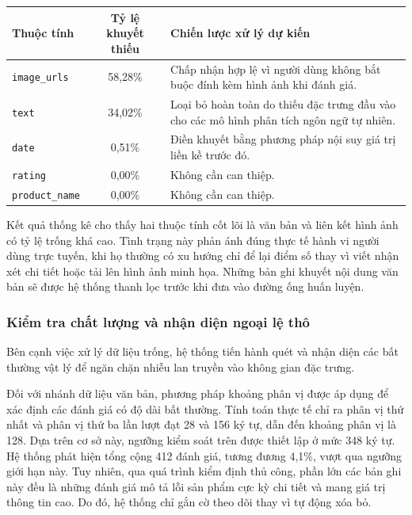 \begin{center}
\renewcommand{\arraystretch}{1.4}
\begin{tabularx}{\textwidth}{|l|c|X|}
\hline
\rowcolor[HTML]{E8E8E8}
\textbf{Thuộc tính} & \textbf{Tỷ lệ khuyết thiếu} & \textbf{Chiến lược xử lý dự kiến} \\
\hline
\texttt{image\_urls} & 58,28\% & Chấp nhận hợp lệ vì người dùng không bắt buộc đính kèm hình ảnh khi đánh giá. \\
\hline
\texttt{text} & 34,02\% & Loại bỏ hoàn toàn do thiếu đặc trưng đầu vào cho các mô hình phân tích ngôn ngữ tự nhiên. \\
\hline
\texttt{date} & 0,51\% & Điền khuyết bằng phương pháp nội suy giá trị liền kề trước đó. \\
\hline
\texttt{rating} & 0,00\% & Không cần can thiệp. \\
\hline
\texttt{product\_name} & 0,00\% & Không cần can thiệp. \\
\hline
\end{tabularx}
\end{center}

Kết quả thống kê cho thấy hai thuộc tính cốt lõi là văn bản và liên kết hình ảnh có tỷ lệ trống khá cao. Tình trạng này phản ánh đúng thực tế hành vi người dùng trực tuyến, khi họ thường có xu hướng chỉ để lại điểm số thay vì viết nhận xét chi tiết hoặc tải lên hình ảnh minh họa. Những bản ghi khuyết nội dung văn bản sẽ được hệ thống thanh lọc trước khi đưa vào đường ống huấn luyện.

\subsubsection{Kiểm tra chất lượng và nhận diện ngoại lệ thô}

Bên cạnh việc xử lý dữ liệu trống, hệ thống tiến hành quét và nhận diện các bất thường vật lý để ngăn chặn nhiễu lan truyền vào không gian đặc trưng.

Đối với nhánh dữ liệu văn bản, phương pháp khoảng phân vị được áp dụng để xác định các đánh giá có độ dài bất thường. Tính toán thực tế chỉ ra phân vị thứ nhất và phân vị thứ ba lần lượt đạt 28 và 156 ký tự, dẫn đến khoảng phân vị là 128. Dựa trên cơ sở này, ngưỡng kiểm soát trên được thiết lập ở mức 348 ký tự. Hệ thống phát hiện tổng cộng 412 đánh giá, tương đương 4,1\%, vượt qua ngưỡng giới hạn này. Tuy nhiên, qua quá trình kiểm định thủ công, phần lớn các bản ghi này đều là những đánh giá mô tả lỗi sản phẩm cực kỳ chi tiết và mang giá trị thông tin cao. Do đó, hệ thống chỉ gắn cờ theo dõi thay vì tự động xóa bỏ.

